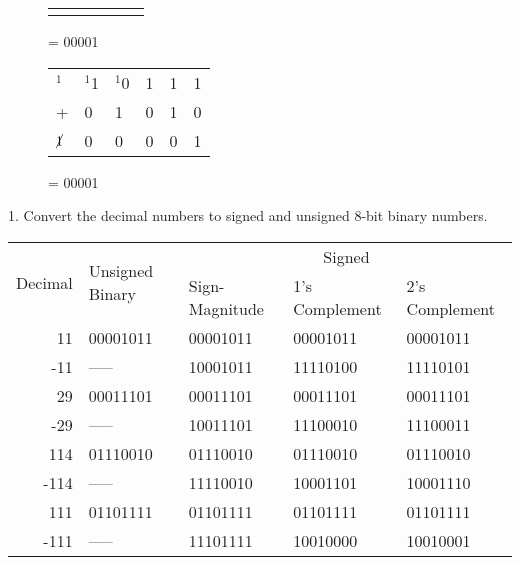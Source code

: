 \begin{enumerate}[label=(\alph*)]
\begin{figure}[H]
\begin{minipage}[t]{0.45\textwidth}
\begin{table}[H]
\begin{tabularx}{0.6\textwidth}{XXXXXX}
                &  & \\
            \end{tabularx}
        \end{table}
        = 00001
    \end{minipage}\hfill
    \begin{minipage}[t]{0.45\textwidth}
        \begin{table}[H]
            \begin{tabularx}{0.6\textwidth}{XXXXXX}
                $^1$& $^1$1 & $^1$0 & 1 & 1 & 1\\
                + & 0 & 1 & 0 & 1 & 0\\
                \hline
                $\cancel{1}$ & 0 & 0 & 0 & 0 & 1 \\
                \hline
            \end{tabularx}
        \end{table}
        = 00001
    \end{minipage}\hfill
\end{figure}
\end{enumerate}



1. Convert the decimal numbers to signed and unsigned 8-bit binary numbers.
\begin{table}[H]
    \centering
    \begin{tabularx}{\textwidth}{r|XXXX}
    \multirow{2}{*}{Decimal} & \multirow{2}{*}{Unsigned Binary} & \multicolumn{3}{c}{Signed} \\
     &  & Sign-Magnitude & 1's Complement & 2's Complement \\
     \hline
    11 & 00001011 & 00001011 & 00001011 & 00001011 \\
    -11 & ----- & 10001011 & 11110100 & 11110101 \\
    29 & 00011101 & 00011101 & 00011101 & 00011101 \\
    -29 & ----- & 10011101 & 11100010 & 11100011 \\
    114 & 01110010 & 01110010 & 01110010 & 01110010 \\
    -114 & ----- & 11110010 & 10001101 & 10001110 \\
    111 & 01101111 & 01101111 & 01101111 & 01101111 \\
    -111 & ----- & 11101111 & 10010000 & 10010001
    \end{tabularx}
\end{table}

